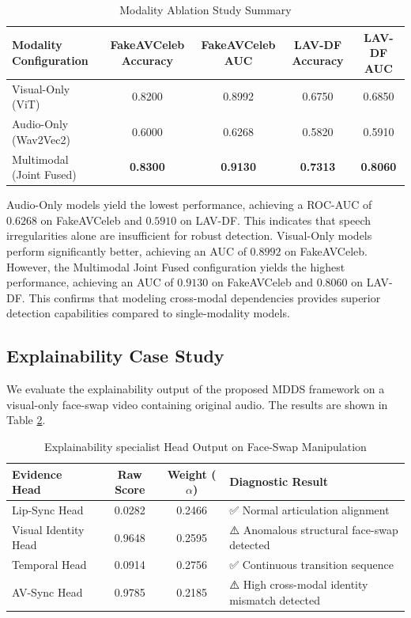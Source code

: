 \documentclass[journal,10pt,onecolumn,draftclsnofoot]{IEEEtran}
\begin{document}
\begin{table}[htbp]
\caption{Modality Ablation Study Summary}
\label{tab:modality_ablation_study}
\centering
\begin{tabular}{lcccc}
\toprule
Modality Configuration & FakeAVCeleb Accuracy & FakeAVCeleb AUC & LAV-DF Accuracy & LAV-DF AUC \\
\midrule
Visual-Only (ViT) & 0.8200 & 0.8992 & 0.6750 & 0.6850 \\
Audio-Only (Wav2Vec2) & 0.6000 & 0.6268 & 0.5820 & 0.5910 \\
Multimodal (Joint Fused) & \textbf{0.8300} & \textbf{0.9130} & \textbf{0.7313} & \textbf{0.8060} \\
\bottomrule
\end{tabular}
\end{table}

Audio-Only models yield the lowest performance, achieving a ROC-AUC of $0.6268$ on FakeAVCeleb and $0.5910$ on LAV-DF. This indicates that speech irregularities alone are insufficient for robust detection. Visual-Only models perform significantly better, achieving an AUC of $0.8992$ on FakeAVCeleb. However, the Multimodal Joint Fused configuration yields the highest performance, achieving an AUC of $0.9130$ on FakeAVCeleb and $0.8060$ on LAV-DF. This confirms that modeling cross-modal dependencies provides superior detection capabilities compared to single-modality models.

\subsection{Explainability Case Study}
We evaluate the explainability output of the proposed MDDS framework on a visual-only face-swap video containing original audio. The results are shown in Table \ref{tab:explainability_case_study}.

\begin{table}[htbp]
\caption{Explainability specialist Head Output on Face-Swap Manipulation}
\label{tab:explainability_case_study}
\centering
\begin{tabular}{lccl}
\toprule
Evidence Head & Raw Score & Weight ($\alpha$) & Diagnostic Result \\
\midrule
Lip-Sync Head & 0.0282 & 0.2466 & ✅ Normal articulation alignment \\
Visual Identity Head & 0.9648 & 0.2595 & ⚠️ Anomalous structural face-swap detected \\
Temporal Head & 0.0914 & 0.2756 & ✅ Continuous transition sequence \\
AV-Sync Head & 0.9785 & 0.2185 & ⚠️ High cross-modal identity mismatch detected \\
\bottomrule
\end{tabular}
\end{table}
\end{document}
